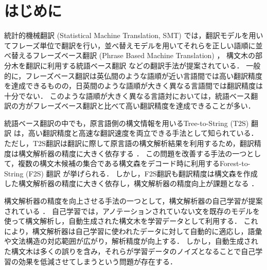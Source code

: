 \documentclass[japanese]{jnlp_1.4}
\begin{document}
\maketitle


\section{はじめに}
\label{sec:introduction}

統計的機械翻訳 (Statistical Machine Translation, SMT) では，翻訳モデルを用いてフレーズ単位で翻訳を行い，並べ替えモデルを用いてそれらを正しい語順に並べ替えるフレーズベース翻訳 (Phrase Based Machine Translation) \cite{koehn03phrasebased}，
構文木の部分木を翻訳に利用する統語ベース翻訳 \cite{yamada01syntaxmt} などの翻訳手法が提案されている．
一般的に，フレーズベース翻訳は英仏間のような語順が近い言語間では高い翻訳精度を達成できるものの，日英間のような語順が大きく異なる言語間では翻訳精度は十分でない．
このような語順が大きく異なる言語対においては，統語ベース翻訳の方がフレーズベース翻訳と比べて高い翻訳精度を達成できることが多い．

統語ベース翻訳の中でも，原言語側の構文情報を用いるTree-to-String (T2S) 翻訳 \cite{liu06treetostring} は，高い翻訳精度と高速な翻訳速度を両立できる手法として知られている．
ただし，T2S翻訳は翻訳に際して原言語の構文解析結果を利用するため，翻訳精度は構文解析器の精度に大きく依存する \cite{neubig14acl}．
この問題を改善する手法の一つとして，複数の構文木候補の集合である構文森をデコード時に利用するForest-to-String (F2S) 翻訳 \cite{mi08forestrule} が挙げられる．
しかし，F2S翻訳も翻訳精度は構文森を作成した構文解析器の精度に大きく依存し，構文解析器の精度向上が課題となる \cite{neubig14acl}．

構文解析器の精度を向上させる手法の一つとして，構文解析器の自己学習が提案されている \cite{mcclosky2006effective}．
自己学習では，アノテーションされていない文を既存のモデルを使って構文解析し，自動生成された構文木を学習データとして利用する．
これにより，構文解析器は自己学習に使われたデータに対して自動的に適応し，語彙や文法構造の対応範囲が広がり，解析精度が向上する．
しかし，自動生成された構文木は多くの誤りを含み，それらが学習データのノイズとなることで自己学習の効果を低減させてしまうという問題が存在する．
\end{document}
